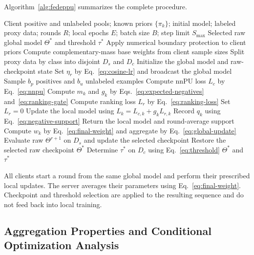 \documentclass[lettersize,journal]{IEEEtran}
\begin{document}
Algorithm~\ref{alg:fedeppu} summarizes the complete procedure.
\begin{algorithm}[t]
\caption{FedEPPU Training and Inference}
\label{alg:fedeppu}
\begin{algorithmic}[1]
\Require Client positive and unlabeled pools; known priors $\{\pi_k\}$; initial model; labeled proxy data; rounds $R$; local epochs $E$; batch size $B$; step limit $S_{\max}$
\Ensure Selected raw global model $\Theta^*$ and threshold $\tau^*$
\State Apply numerical boundary protection to client priors
\State Compute complementary-mass base weights from client sample sizes
\State Split proxy data by class into disjoint $D_s$ and $D_c$
\State Initialize the global model and raw-checkpoint state
    \State Set $\eta_r$ by Eq.~\eqref{eq:cosine-lr} and broadcast the global model
            \State Sample $b_p$ positives and $b_u$ unlabeled examples
            \State Compute nnPU loss $L_c$ by Eq.~\eqref{eq:nnpu}
            \State Compute $m_k$ and $g_k$ by Eqs.~\eqref{eq:expected-negatives} and~\eqref{eq:ranking-gate}
                \State Compute ranking loss $L_r$ by Eq.~\eqref{eq:ranking-loss}
            \Else
                \State Set $L_r=0$
            \EndIf
            \State Update the local model using $L_k=L_{c,k}+g_kL_{r,k}$
            \State Record $q_k$ using Eq.~\eqref{eq:negative-support}
        \EndFor
        \State Return the local model and round-average support
    \EndFor
    \State Compute $w_k$ by Eq.~\eqref{eq:final-weight} and aggregate by Eq.~\eqref{eq:global-update}
        \State Evaluate raw $\Theta^{r+1}$ on $D_s$ and update the selected checkpoint
    \EndIf
\EndFor
\State Restore the selected raw checkpoint $\Theta^*$
\State Determine $\tau^*$ on $D_c$ using Eq.~\eqref{eq:threshold}
\State \Return $\Theta^*$ and $\tau^*$
\end{algorithmic}
\end{algorithm}

All clients start a round from the same global model and perform their prescribed local updates. The server averages their parameters using Eq.~\eqref{eq:final-weight}. Checkpoint and threshold selection are applied to the resulting sequence and do not feed back into local training.

\subsection{Aggregation Properties and Conditional Optimization Analysis}
\label{sec:convergence}
\end{document}
